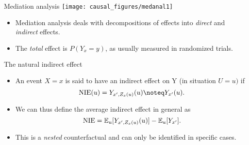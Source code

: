 \begin{frame}{Mediation analysis}
    \centering
    \texttt{[image: causal\_figures/medanal1]}%
    \begin{itemize}
        \item Mediation analysis deals with decompositions of effects into \emph{direct} and \emph{indirect} effects.
        \item The \emph{total} effect is $P(Y_x = y)$, as usually measured in randomized trials.
    \end{itemize}
\end{frame}


\begin{frame}{The natural indirect effect}
    \begin{itemize}
        \item An event $X = x$ is said to have an indirect effect on Y (in situation $U = u)$ if
        \begin{equation*}
            \mathrm{NIE}(u) = Y_{x', Z_x(u)}(u) \noteq Y_{x'}(u).
        \end{equation*}
        \item We can thus define the average indirect effect in general as
        \begin{equation*}
            \mathrm{NIE} = \operatorname{\mathbb{E}}_u[Y_{x', Z_x(u)}(u)] - \operatorname{\mathbb{E}}_u[Y_{x'}].
        \end{equation*}
        \item This is a \emph{nested} counterfactual and can only be identified in specific cases.
    \end{itemize}
\end{frame}


